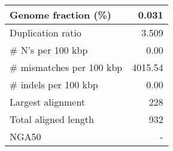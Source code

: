 \documentclass[12pt,a4paper]{article}
\begin{document}
\begin{table}[ht]
\begin{center}
\begin{tabular}{|l*{1}{|r}|}
Genome fraction (\%) & 0.031 \\ \hline
Duplication ratio & 3.509 \\ \hline
\# N's per 100 kbp & 0.00 \\ \hline
\# mismatches per 100 kbp & 4015.54 \\ \hline
\# indels per 100 kbp & 0.00 \\ \hline
Largest alignment & 228 \\ \hline
Total aligned length & 932 \\ \hline
NGA50 & - \\ \hline
\end{tabular}
\end{center}
\end{table}
\end{document}
